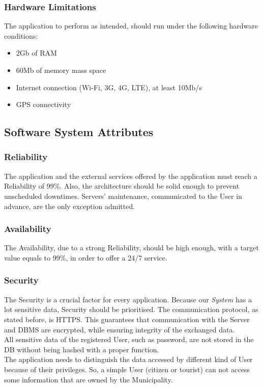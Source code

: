 \documentclass {article}
\begin{document}
	\subsubsection{Hardware Limitations}
	The application to perform as intended, should run under the following hardware conditions:
	\begin{itemize}
		\item 2Gb of RAM
		\item 60Mb of memory mass space
		\item Internet connection (Wi-Fi, 3G, 4G, LTE), at least 10Mb/s
		\item GPS connectivity
	\end{itemize}
	\subsection{Software System Attributes}
	\subsubsection{Reliability}
	The application and the external services offered by the application must reach a Reliability of 99\%. Also, the architecture should be solid enough to prevent unscheduled downtimes. Servers' maintenance, communicated to the User in advance, are the only exception admitted.
	\subsubsection{Availability}
	The Availability, due to a strong Reliability, should be high enough, with a target value equals to 99\%, in order to offer a 24/7 service.
	\subsubsection{Security}
	The Security is a crucial factor for every application. Because our {\it System} has a lot sensitive data, Security should be prioritised. The communication protocol, as stated before, is HTTPS. This guarantees that communication with the Server and DBMS are encrypted, while ensuring integrity of the exchanged data. \\
	All sensitive data of the registered User, such as password, are not stored in the DB without being hashed with a proper function. \\ 
	The application needs to distinguish the data accessed by different kind of User because of their privileges. So, a simple User (citizen or tourist) can not access some information that are owned by the Municipality. 
\end{document}
